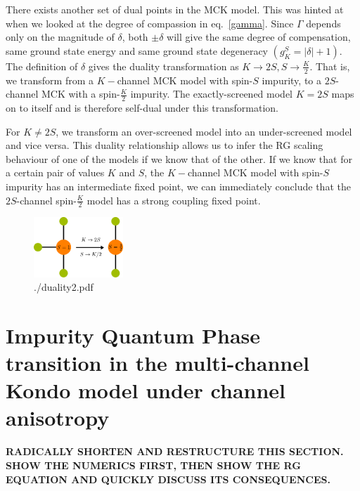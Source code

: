\documentclass[reprint,prb,superscriptaddress]{revtex4-2}
\begin{document}
There exists another set of dual points in the MCK model. This was hinted at when we looked at the degree of compassion in eq.~\ref{gamma}. Since \(\Gamma\) depends only on the magnitude of \(\delta\), both \(\pm \delta\) will give the same degree of compensation, same ground state energy and same ground state degeneracy \(\left(g^S_K = |\delta|+1\right)\). The definition of \(\delta\) gives the duality transformation as \(K \to 2S, S \to \frac{K}{2}\). That is, we transform from a \(K-\)channel MCK model with spin-\(S\) impurity, to a \(2S\)-channel MCK with a spin-\(\frac{K}{2}\) impurity. The exactly-screened model \(K=2S\) maps on to itself and is therefore self-dual under this transformation.

For \(K \neq 2S\), we transform an over-screened model into an under-screened model and vice versa. This duality relationship allows us to infer the RG scaling behaviour of one of the models if we know that of the other. If we know that for a certain pair of values \(K\) and \(S\), the \(K-\)channel MCK model with spin-\(S\) impurity has an intermediate fixed point, we can immediately conclude that the \(2S\)-channel spin-\(\frac{K}{2}\) model has a strong coupling fixed point.
\begin{figure}[htpb]
	\centering
	\includegraphics[width=0.3\textwidth]{plt/duality2.pdf}
	\caption{./duality2.pdf}
	\label{fig:-duality2-pdf}
\end{figure}



\section{Impurity Quantum Phase transition in the multi-channel Kondo model under channel anisotropy}
\label{anisotropic_rg}
\textbf{RADICALLY SHORTEN AND RESTRUCTURE THIS SECTION. SHOW THE NUMERICS FIRST, THEN SHOW THE RG 
EQUATION AND QUICKLY DISCUSS ITS CONSEQUENCES.}
\end{document}
